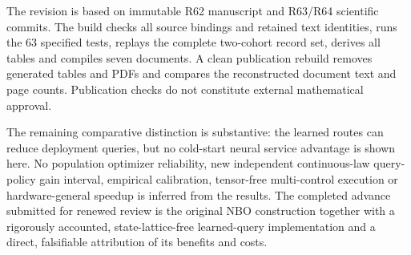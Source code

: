 \documentclass[ecta,nameyear,draft]{econsocart}
\begin{document}
The revision is based on immutable R62 manuscript and R63/R64 scientific
commits. The build checks all source bindings and retained text
identities, runs the 63 specified tests, replays the complete two-cohort
record set, derives all tables and compiles seven documents. A clean
publication rebuild removes generated tables and PDFs and compares the
reconstructed document text and page counts. Publication checks do not
constitute external mathematical approval.

The remaining comparative distinction is substantive: the learned routes
can reduce deployment queries, but no cold-start neural service
advantage is shown here. No population optimizer reliability, new
independent continuous-law query-policy gain interval, empirical
calibration, tensor-free multi-control execution or hardware-general
speedup is inferred from the results. The completed advance submitted
for renewed review is the original NBO construction together with a
rigorously accounted, state-lattice-free learned-query implementation
and a direct, falsifiable attribution of its benefits and costs.
\end{document}
